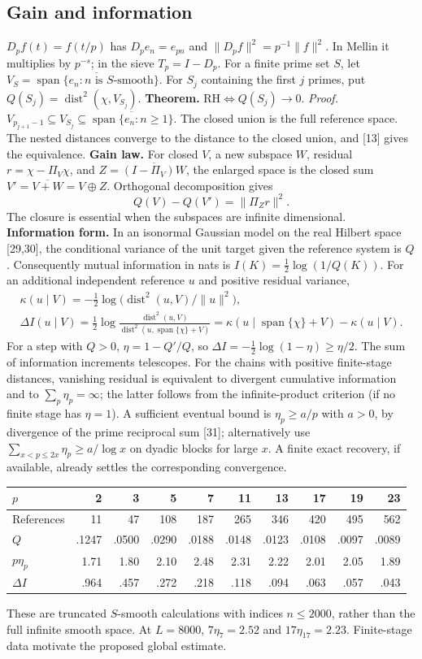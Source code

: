 \documentclass[11pt,a4paper]{article}
\DeclareMathOperator{\dist}{dist}
\newcommand{\RH}{\mathrm{RH}}
\begin{document}
\subsection{Gain and information}
$D_pf(t)=f(t/p)$ has $D_pe_n=e_{pn}$ and $\|D_pf\|^2=p^{-1}\|f\|^2$. In Mellin it multiplies by $p^{-s}$; in the sieve $T_p=I-D_p$. For a finite prime set $S$, let $V_S=\overline{\operatorname{span}\{e_n:n\text{ is }S\text{-smooth}\}}$. For $S_j$ containing the first $j$ primes, put $Q(S_j)=\dist^2(\chi,V_{S_j})$.
\textbf{Theorem.} $\RH\iff Q(S_j)\to0$.
\emph{Proof.} $V_{p_{j+1}-1}\subseteq V_{S_j}\subseteq\overline{\operatorname{span}\{e_n:n\ge1\}}$. The closed union is the full reference space. The nested distances converge to the distance to the closed union, and [13] gives the equivalence.
\textbf{Gain law.} For closed $V$, a new subspace $W$, residual $r=\chi-\Pi_V\chi$, and $Z=\overline{(I-\Pi_V)W}$, the enlarged space is the closed sum $V'=\overline{V+W}=V\oplus Z$. Orthogonal decomposition gives
\[Q(V)-Q(V')=\|\Pi_Zr\|^2.\tag{4.4}\]
The closure is essential when the subspaces are infinite dimensional.
\textbf{Information form.} In an isonormal Gaussian model on the real Hilbert space [29,30], the conditional variance of the unit target given the reference system is $Q$. Consequently mutual information in nats is $I(K)=\tfrac12\log(1/Q(K))$. For an additional independent reference $u$ and positive residual variance,
\begin{gather*}\kappa(u\mid V)=-\tfrac12\log\big(\dist^2(u,V)/\|u\|^2\big),\\
\Delta I(u\mid V)=\tfrac12\log\frac{\dist^2(u,V)}{\dist^2(u,\operatorname{span}\{\chi\}+V)}=\kappa(u\mid\operatorname{span}\{\chi\}+V)-\kappa(u\mid V).\end{gather*}
For a step with $Q>0$, $\eta=1-Q'/Q$, so $\Delta I=-\tfrac12\log(1-\eta)\ge\eta/2$. The sum of information increments telescopes. For the chains with positive finite-stage distances, vanishing residual is equivalent to divergent cumulative information and to $\sum_p\eta_p=\infty$; the latter follows from the infinite-product criterion (if no finite stage has $\eta=1$). A sufficient eventual bound is $\eta_p\ge a/p$ with $a>0$, by divergence of the prime reciprocal sum [31]; alternatively use $\sum_{x<p\le2x}\eta_p\ge a/\log x$ on dyadic blocks for large $x$. A finite exact recovery, if available, already settles the corresponding convergence.
\begin{center}\small\begin{tabular}{@{}lrrrrrrrrr@{}}\toprule
$p$&2&3&5&7&11&13&17&19&23\\\midrule
References&11&47&108&187&265&346&420&495&562\\
$Q$&.1247&.0500&.0290&.0188&.0148&.0123&.0108&.0097&.0089\\
$p\eta_p$&1.71&1.80&2.10&2.48&2.31&2.22&2.01&2.05&1.89\\
$\Delta I$&.964&.457&.272&.218&.118&.094&.063&.057&.043\\\bottomrule\end{tabular}\end{center}
These are truncated $S$-smooth calculations with indices $n\le2000$, rather than the full infinite smooth space. At $L=8000$, $7\eta_7=2.52$ and $17\eta_{17}=2.23$. Finite-stage data motivate the proposed global estimate.
\end{document}
